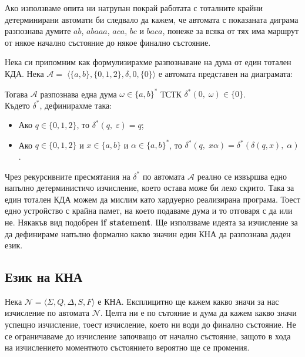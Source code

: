 \documentclass[12pt]{article}
\begin{document}
Ако използваме опита ни натрупан покрай работата с тоталните крайни детерминирани автомати би следвало да кажем, че автомата с показаната диграма разпознава думите \(ab\), \(abaaa\), \(aca\), \(bc\) и \(baca\), понеже за всяка от тях има маршрут от някое начално състояние до някое финално състояние. \\\par
Нека си припомним как формулизирахме разпознаване на дума от един тотален КДА.
Нека \(\mathcal{A} = \;\langle \{a, b\}, \{0, 1, 2\}, \delta, 0, \{0\} \rangle\) е автомата представен на диаграмата:
\begin{center}
\end{center}
Тогава \(\mathcal{A}\) разпознава една дума \(\omega \in \{a, b\}^*\) ТСТК \(\delta^*(0, \; \omega) \in \{0\}\). \\
Където \(\delta^*\), дефинирахме така:
\begin{itemize}
    \item Ако \(q \in \{0, 1, 2\}\), то \(\delta^*(q, \; \varepsilon) = q\);
    \item Ако \(q \in \{0, 1, 2\}\) и \(x \in \{a, b\}\) и \(\alpha \in \{a, b\}^*\), то \(\delta^*(q, \; x\alpha) = \delta^*(\delta(q, x), \; \alpha) \).
\end{itemize}

Чрез рекурсивните пресмятания на \(\delta^*\) по автомата \(\mathcal{A}\) реално се извършва едно напълно детерминистичо изчисление, което остава може би леко скрито. Така за един тотален КДА можем да мислим като хардуерно реализирана програма.
Тоест едно устройство с крайна памет, на което подаваме дума и то отговаря с да или не.
Някакъв вид подобрен \textbf{if statement}.
Ще използваме идеята за изчисление за да дефинираме напълно формално какво значин един КНА да разпознава даден език.

\subsection{Език на КНА}
Нека \(\mathcal{N} = \langle \Sigma, Q, \Delta, S, F \rangle\) е КНА.
Експлицитно ще кажем какво значи за нас изчисление по автомата \(\mathcal{N}\).
Целта ни е по сътояние и дума да кажем какво значи успещно изчисление, тоест изчисление, което ни води до финално състояние.
Не се ограничаваме до изчисление започващо от начално състояние, защото в хода на изчислението моментното състоянието вероятно ще се промения. \\\par
\end{document}
